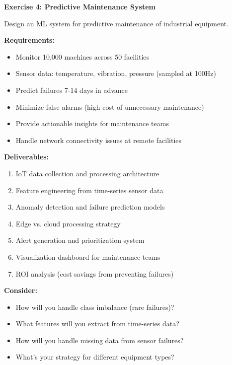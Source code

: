 \begin{exercise}
\textbf{Exercise 4: Predictive Maintenance System}

Design an ML system for predictive maintenance of industrial equipment.

\textbf{Requirements:}
\begin{itemize}
    \item Monitor 10,000 machines across 50 facilities
    \item Sensor data: temperature, vibration, pressure (sampled at 100Hz)
    \item Predict failures 7-14 days in advance
    \item Minimize false alarms (high cost of unnecessary maintenance)
    \item Provide actionable insights for maintenance teams
    \item Handle network connectivity issues at remote facilities
\end{itemize}

\textbf{Deliverables:}
\begin{enumerate}
    \item IoT data collection and processing architecture
    \item Feature engineering from time-series sensor data
    \item Anomaly detection and failure prediction models
    \item Edge vs. cloud processing strategy
    \item Alert generation and prioritization system
    \item Visualization dashboard for maintenance teams
    \item ROI analysis (cost savings from preventing failures)
\end{enumerate}

\textbf{Consider:}
\begin{itemize}
    \item How will you handle class imbalance (rare failures)?
    \item What features will you extract from time-series data?
    \item How will you handle missing data from sensor failures?
    \item What's your strategy for different equipment types?
\end{itemize}
\end{exercise}

